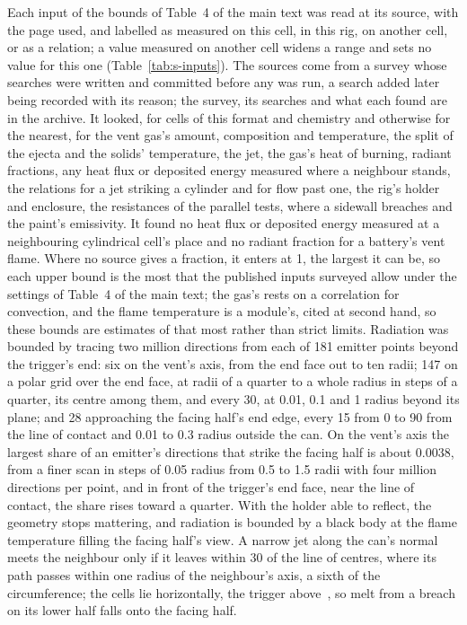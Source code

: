 \documentclass[preprint,12pt]{elsarticle}
\begin{document}
Each input of the bounds of Table~4 of the main text was read at its source, with the page used, and labelled as measured on this cell, in this rig, on another cell, or as a relation; a value measured on another cell widens a range and sets no value for this one (Table~\ref{tab:s-inputs}). The sources come from a survey whose searches were written and committed before any was run, a search added later being recorded with its reason; the survey, its searches and what each found are in the archive. It looked, for cells of this format and chemistry and otherwise for the nearest, for the vent gas's amount, composition and temperature, the split of the ejecta and the solids' temperature, the jet, the gas's heat of burning, radiant fractions, any heat flux or deposited energy measured where a neighbour stands, the relations for a jet striking a cylinder and for flow past one, the rig's holder and enclosure, the resistances of the parallel tests, where a sidewall breaches and the paint's emissivity. It found no heat flux or deposited energy measured at a neighbouring cylindrical cell's place and no radiant fraction for a battery's vent flame. Where no source gives a fraction, it enters at 1, the largest it can be, so each upper bound is the most that the published inputs surveyed allow under the settings of Table~4 of the main text; the gas's rests on a correlation for convection, and the flame temperature is a module's, cited at second hand, so these bounds are estimates of that most rather than strict limits. Radiation was bounded by tracing two million directions from each of 181 emitter points beyond the trigger's end: six on the vent's axis, from the end face out to ten radii; 147 on a polar grid over the end face, at radii of a quarter to a whole radius in steps of a quarter, its centre among them, and every 30\textdegree, at 0.01, 0.1 and 1 radius beyond its plane; and 28 approaching the facing half's end edge, every 15\textdegree{} from 0 to 90\textdegree{} from the line of contact and 0.01 to 0.3 radius outside the can. On the vent's axis the largest share of an emitter's directions that strike the facing half is about 0.0038, from a finer scan in steps of 0.05 radius from 0.5 to 1.5 radii with four million directions per point, and in front of the trigger's end face, near the line of contact, the share rises toward a quarter. With the holder able to reflect, the geometry stops mattering, and radiation is bounded by a black body at the flame temperature filling the facing half's view. A narrow jet along the can's normal meets the neighbour only if it leaves within 30\textdegree{} of the line of centres, where its path passes within one radius of the neighbour's axis, a sixth of the circumference; the cells lie horizontally, the trigger above~\cite{fransson2024exploring}, so melt from a breach on its lower half falls onto the facing half.
\end{document}
